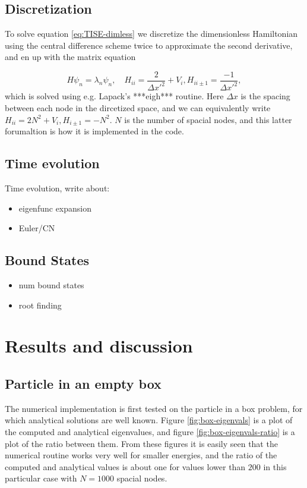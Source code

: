 \documentclass{article}
\begin{document}
\subsection{Discretization}
To solve equation \ref{eq:TISE-dimless} we discretize the dimensionless Hamiltonian using the central difference scheme twice to approximate the second derivative, and en up with the matrix equation

\begin{equation}
    H\psi_n = \lambda_n \psi_n, \quad H_{ii} = \frac{2}{\Delta x'^2} + V_i, 
    H_{ii\pm1}=\frac{-1}{\Delta x'^2},
\end{equation}
which is solved using e.g. Lapack's ***eigh*** routine. Here $\Delta x$ is the spacing between each node in the dircetized space, and we can equivalently write $H_{ii} = 2N^2 + V_i, H_{i\pm1} = -N^2$. $N$ is the number of spacial nodes, and this latter forumaltion is how it is implemented in the code.

\subsection{Time evolution}
Time evolution, write about:
\begin{itemize}
    \item eigenfunc expansion
    \item Euler/CN
\end{itemize}

\subsection{Bound States}
\begin{itemize}
    \item num bound states
    \item root finding
\end{itemize}

\section{Results and discussion}
\subsection{Particle in an empty box}
The numerical implementation is first tested on the particle in a box problem, for which analytical solutions are well known. Figure \ref{fig:box-eigenvals} is a plot of the computed and analytical eigenvalues, and figure \ref{fig:box-eigenvals-ratio} is a plot of the ratio between them. From these figures it is easily seen that the numerical routine works very well for smaller energies, and the ratio of the computed and analytical values is about one for values lower than $200$ in this particular case with $N = 1000$ spacial nodes.
\end{document}
